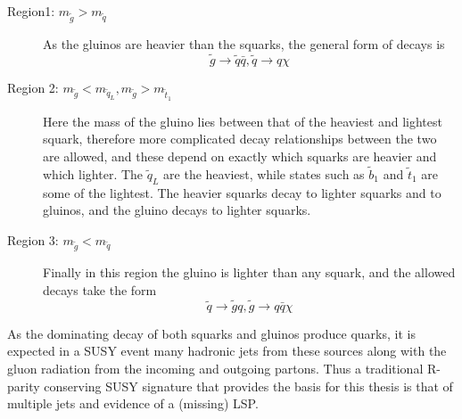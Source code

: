 \begin{description}
\item[Region1: $m_{\tilde{g}} > m_{\tilde{q}}$]{As the gluinos are heavier than the squarks, the general form of decays is
\begin{equation}
\tilde{g} \rightarrow \tilde{q} \bar{q} , \tilde{q} \rightarrow q \chi
\end{equation}
}
\item[Region 2: $m_{\tilde{g}}< m_{\tilde{q}_{L}}, m_{\tilde{g}}> m_{\tilde{t}_{1}} $]{Here the mass of the gluino lies between that of the heaviest and lightest squark, therefore more complicated decay relationships between the two are allowed, and these depend on exactly which squarks are heavier and which lighter. The $\tilde{q}_{L}$ are the heaviest, while states such as $\tilde{b}_{1}$ and $\tilde{t}_{1}$ are some of the lightest. The heavier squarks decay to lighter squarks and to gluinos, and the gluino decays to lighter squarks. }
\item[Region 3: $m_{\tilde{g}} < m_{\tilde{q}}$]{Finally in this region the gluino is lighter than any squark, and the allowed decays take the form
\begin{equation}
\tilde{q} \rightarrow \tilde{g}q , \tilde{g} \rightarrow q\bar{q} \chi
\end{equation}
}
\end{description}

As the dominating decay of both squarks and gluinos produce quarks, it is expected in a SUSY event many hadronic jets from these sources along with the gluon radiation from the incoming and outgoing partons. Thus a traditional R-parity conserving SUSY signature that provides the basis for this thesis is that of multiple jets and evidence of a (missing) LSP. 



